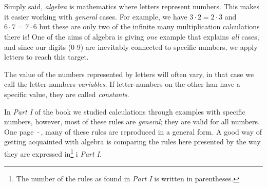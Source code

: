 



\section{\algintro}
Simply said, \textit{algebra} is mathematics where letters represent numbers. This makes it easier working with \textsl{general} cases. For example, we have $ {3\cdot 2=2\cdot3} $ and $ 6\cdot7=7\cdot6 $ but these are only two of the infinite many multiplication calculations there is! One of the aims of algebra is giving \textsl{one} example that explains \textsl{all} cases, and since our digits (0-9) are inevitably connected to specific numbers, we apply letters to reach this target. \vsk

The value of the numbers represented by letters will often vary, in that case we call the letter-numbers \textit{variables}. If letter-numbers on the other han have a specific value, they are called \textit{constants}.

\vsk

In \textsl{Part I} of the book we studied calculations through examples with specific numbers, however, most of these rules are \textsl{general}; they are valid for all numbers. One page \pageref{regstart}\,-\,\pageref{regslutt}, many of these rules are reproduced in a general form. A good way of getting acquainted with algebra is comparing the rules here presented by the way they are expressed in\footnote{The number of the rules as found in \textsl{Part I} is written in parentheses.} i \textsl{Part I}. \vsk

\regv
\label{regstart}
\reg[\adkom\;(\ref{adkom}) \label{adkomalg}]{\vs
\[ a+ b =b+a \]
}
\eks{ \vsb
\[ 7+ 5=5+7 \]
} \vsk \vsk

\reg[\gangkom\;(\ref{gangkom})]{\vs
	\[ a\cdot b =b\cdot a \]
}
\eks[1]{ \vsb
	\[ 9\cdot 8=8\cdot9 \]
}
\eks[2]{ \vsb
\[  8\cdot a= a\cdot 8  \]
}
\newpage
{}
\vsk 

\reg[\brdef\;(\ref{brdef})]{
\[ a:b=\frac{a}{b} \]
}
\eks[]{ \vs
\[a:2= \frac{a}{2} \]
}
 \vsk 

